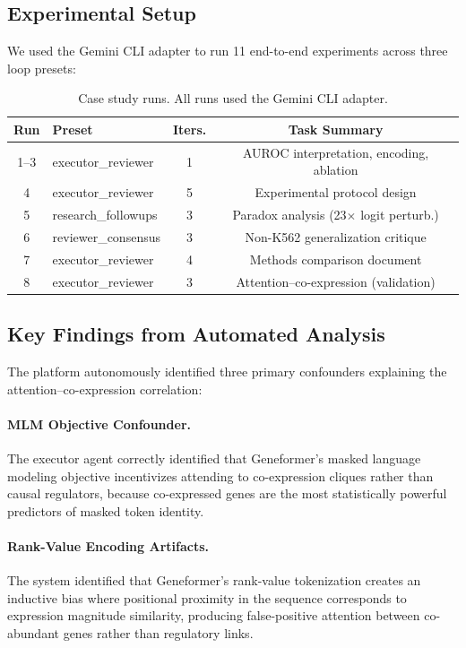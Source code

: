 \documentclass[10pt]{article}
\begin{document}
\subsection{Experimental Setup}
We used the Gemini CLI adapter to run 11 end-to-end experiments across three loop presets:

\begin{table}[t]
\centering
\small
\caption{Case study runs. All runs used the Gemini CLI adapter.}
\label{tab:runs}
\begin{tabular}{@{}clcc@{}}
\toprule
\textbf{Run} & \textbf{Preset} & \textbf{Iters.} & \textbf{Task Summary} \\
\midrule
1--3 & executor\_reviewer & 1 & AUROC interpretation, encoding, ablation \\
4 & executor\_reviewer & 5 & Experimental protocol design \\
5 & research\_followups & 3 & Paradox analysis (23$\times$ logit perturb.) \\
6 & reviewer\_consensus & 3 & Non-K562 generalization critique \\
7 & executor\_reviewer & 4 & Methods comparison document \\
8 & executor\_reviewer & 3 & Attention--co-expression (validation) \\
\bottomrule
\end{tabular}
\end{table}

\subsection{Key Findings from Automated Analysis}

The platform autonomously identified three primary confounders explaining the attention--co-expression correlation:

\paragraph{MLM Objective Confounder.}
The executor agent correctly identified that Geneformer's masked language modeling objective incentivizes attending to co-expression cliques rather than causal regulators, because co-expressed genes are the most statistically powerful predictors of masked token identity.

\paragraph{Rank-Value Encoding Artifacts.}
The system identified that Geneformer's rank-value tokenization creates an inductive bias where positional proximity in the sequence corresponds to expression magnitude similarity, producing false-positive attention between co-abundant genes rather than regulatory links.
\end{document}
